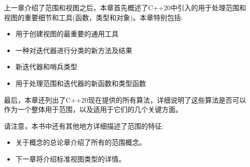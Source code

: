 上一章介绍了范围和视图之后，本章首先概述了C++20中引入的用于处理范围和视图的重要细节和工具(函数，类型和对象)。本章特别包括:

\begin{itemize}
\item
用于创建视图的最重要的通用工具

\item
一种对迭代器进行分类的新方法及结果

\item
新迭代器和哨兵类型

\item
用于处理范围和迭代器的新函数和类型函数
\end{itemize}

最后，本章还列出了C++20现在提供的所有算法，详细说明了这些算法是否可以作为一个整体用于范围，以及适用于它们的几个关键方面。

请注意，本书中还有其他地方详细描述了范围的特征:

\begin{itemize}
\item
关于概念的总论章介绍了所有的范围概念。

\item
下一章将介绍标准视图类型的详情。
\end{itemize}













